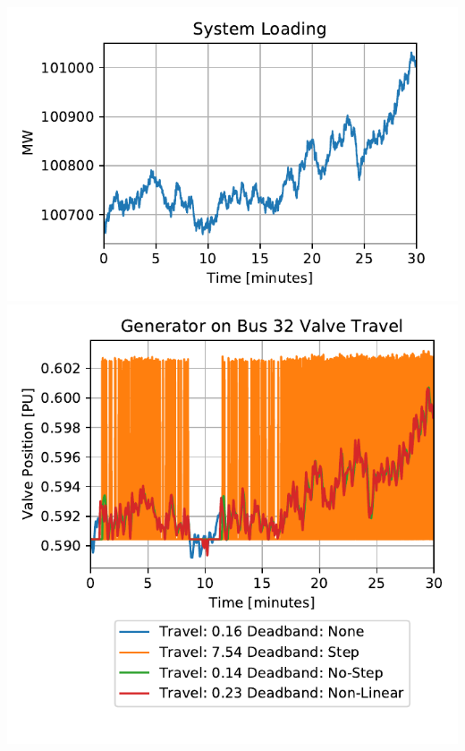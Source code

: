 \documentclass[12pt]{article}
\begin{document}
\begin{multicols}{2}
\includegraphics[width=\linewidth]{miniWECCnoiseNoDBPload}
\includegraphics[width=\linewidth]{gen32ValveComp}

\end{multicols}
\end{document}
